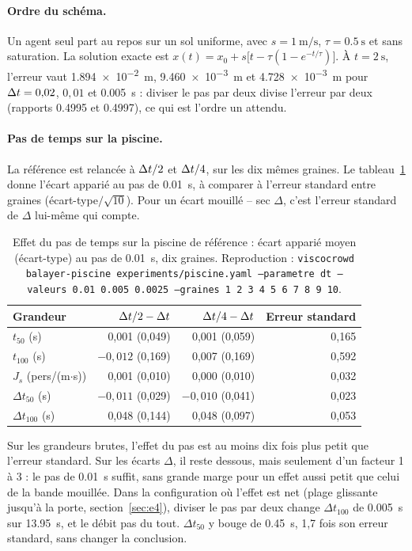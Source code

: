 \paragraph{Ordre du schéma.} Un agent seul part au repos sur un sol uniforme, avec
$s=\SI{1}{\metre\per\second}$, $\tau=\SI{0.5}{\second}$ et sans saturation. La solution
exacte est $x(t)=x_0+s\bigl[t-\tau(1-e^{-t/\tau})\bigr]$. À $t=\SI{2}{\second}$, l'erreur vaut
\SI{1.894e-2}{\metre}, \SI{9.460e-3}{\metre} et \SI{4.728e-3}{\metre} pour $\Delta t=0{,}02$, $0{,}01$
et \SI{0.005}{\second} : diviser le pas par deux divise l'erreur par deux (rapports
\num{0.4995} et \num{0.4997}), ce qui est l'ordre un attendu.

\paragraph{Pas de temps sur la piscine.} La référence est relancée à $\Delta t/2$ et $\Delta t/4$, sur
les dix mêmes graines. Le tableau~\ref{tab:sensibilite-dt} donne l'écart apparié au pas de
\SI{0.01}{\second}, à comparer à l'erreur standard entre graines (écart-type$/\sqrt{10}$).
Pour un écart mouillé -- sec $\Delta$, c'est l'erreur standard de $\Delta$ lui-même qui compte.

\begin{table}[ht]
\centering
\caption{Effet du pas de temps sur la piscine de référence : écart apparié moyen
(écart-type) au pas de \SI{0.01}{\second}, dix graines. Reproduction :
\texttt{viscocrowd balayer-piscine experiments/piscine.yaml --parametre dt --valeurs 0.01
0.005 0.0025 --graines 1 2 3 4 5 6 7 8 9 10}.}
\label{tab:sensibilite-dt}
\begin{tabular}{lrrr}
\toprule
Grandeur & $\Delta t/2-\Delta t$ & $\Delta t/4-\Delta t$ & Erreur standard \\
\midrule
$t_{50}$ (s) & 0,001 (0,049) & 0,001 (0,059) & 0,165 \\
$t_{100}$ (s) & $-0{,}012$ (0,169) & 0,007 (0,169) & 0,592 \\
$J_s$ (pers/(m$\cdot$s)) & 0,001 (0,010) & 0,000 (0,010) & 0,032 \\
$\Delta t_{50}$ (s) & $-0{,}011$ (0,029) & $-0{,}010$ (0,041) & 0,023 \\
$\Delta t_{100}$ (s) & 0,048 (0,144) & 0,048 (0,097) & 0,053 \\
\bottomrule
\end{tabular}
\end{table}

Sur les grandeurs brutes, l'effet du pas est au moins dix fois plus petit que l'erreur
standard. Sur les écarts $\Delta$, il reste dessous, mais seulement d'un facteur 1 à 3 : le pas
de \SI{0.01}{\second} suffit, sans grande marge pour un effet aussi petit que celui de la
bande mouillée. Dans la configuration où l'effet est net (plage glissante jusqu'à la porte,
section~\ref{sec:e4}), diviser le pas par deux change $\Delta t_{100}$ de \SI{0.005}{\second}
sur \SI{13.95}{\second}, et le débit pas du tout. $\Delta t_{50}$ y bouge de
\SI{0.45}{\second}, 1,7 fois son erreur standard, sans changer la conclusion.

